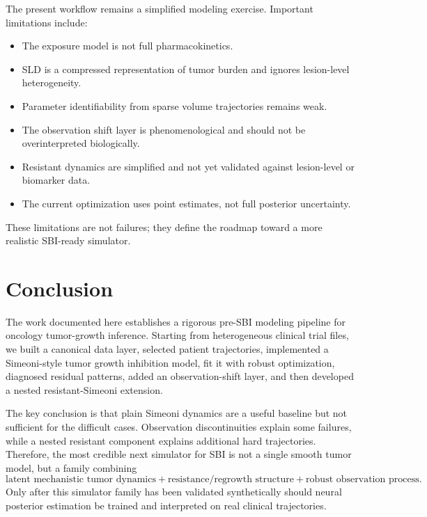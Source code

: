 \documentclass[11pt,a4paper]{article}
\begin{document}
The present workflow remains a simplified modeling exercise. Important limitations include:
\begin{itemize}[leftmargin=2em]
    \item The exposure model is not full pharmacokinetics.
    \item SLD is a compressed representation of tumor burden and ignores lesion-level heterogeneity.
    \item Parameter identifiability from sparse volume trajectories remains weak.
    \item The observation shift layer is phenomenological and should not be overinterpreted biologically.
    \item Resistant dynamics are simplified and not yet validated against lesion-level or biomarker data.
    \item The current optimization uses point estimates, not full posterior uncertainty.
\end{itemize}

These limitations are not failures; they define the roadmap toward a more realistic SBI-ready simulator.

\section{Conclusion}

The work documented here establishes a rigorous pre-SBI modeling pipeline for oncology tumor-growth inference. Starting from heterogeneous clinical trial files, we built a canonical data layer, selected patient trajectories, implemented a Simeoni-style tumor growth inhibition model, fit it with robust optimization, diagnosed residual patterns, added an observation-shift layer, and then developed a nested resistant-Simeoni extension.

The key conclusion is that plain Simeoni dynamics are a useful baseline but not sufficient for the difficult cases. Observation discontinuities explain some failures, while a nested resistant component explains additional hard trajectories. Therefore, the most credible next simulator for SBI is not a single smooth tumor model, but a family combining
\[
    \text{latent mechanistic tumor dynamics}
    + \text{resistance/regrowth structure}
    + \text{robust observation process}.
\]
Only after this simulator family has been validated synthetically should neural posterior estimation be trained and interpreted on real clinical trajectories.
\end{document}
